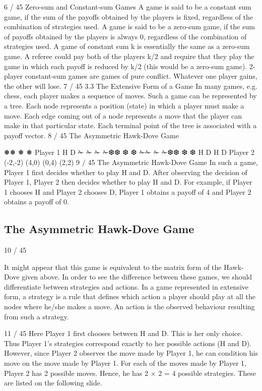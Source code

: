 6 / 45
Zero-sum and Constant-sum Games
A game is said to be a constant sum game, if the sum of the
payoffs obtained by the players is fixed, regardless of the
combination of strategies used.
A game is said to be a zero-sum game, if the sum of payoffs
obtained by the players is always 0, regardless of the combination
of strategies used.
A game of constant sum k is essentially the same as a zero-sum
game. A referee could pay both of the players k/2 and require that
they play the game in which each payoff is reduced by k/2 (this
would be a zero-sum game).
2-player constant-sum games are games of pure conflict.
Whatever one player gains, the other will lose.
7 / 45
3.3 The Extensive Form of a Game
In many games, e.g. chess, each player makes a sequence of moves.
Such a game can be represented by a tree. Each node represents a
position (state) in which a player must make a move.
Each edge coming out of a node represents a move that the player
can make in that particular state.
Each terminal point of the tree is associated with a payoff vector.
8 / 45
The Asymmetric Hawk-Dove Game



❅❅
❅
❅
Player 1
H D
✁
✁
✁
✁❆❆
❆
❆ ✁✁
✁
✁❆❆
❆
❆
H D H D
Player 2
(-2,-2) (4,0) (0,4) (2,2)
9 / 45
The Asymmetric Hawk-Dove Game
In such a game, Player 1 first decides whether to play H and D.
After observing the decision of Player 1, Player 2 then decides
whether to play H and D.
For example, if Player 1 chooses H and Player 2 chooses D, Player
1 obtains a payoff of 4 and Player 2 obtains a payoff of 0.

\subsection{The Asymmetric Hawk-Dove Game}
10 / 45

It might appear that this game is equivalent to the matrix form of
the Hawk-Dove given above.
In order to see the difference between these games, we should
differentiate between strategies and actions.
In a game represented in extensive form, a strategy is a rule that
defines which action a player should play at all the nodes where
he/she makes a move.
An action is the observed behaviour resulting from such a strategy.

11 / 45
Here Player 1 first chooses between H and D. This is her only
choice. Thus Player 1’s strategies correspond exactly to her
possible actions (H and D).
However, since Player 2 observes the move made by Player 1, he
can condition his move on the move made by Player 1.
For each of the moves made by Player 1, Player 2 has 2 possible
moves. Hence, he has 2 × 2 = 4 possible strategies. These are
listed on the following slide.

